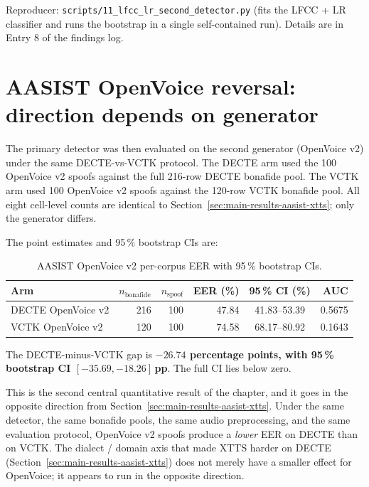 Reproducer: \texttt{scripts/11\_lfcc\_lr\_second\_detector.py} (fits the LFCC +
LR classifier and runs the bootstrap in a single self-contained
run). Details are in Entry 8 of the findings log.


\section{AASIST OpenVoice reversal: direction depends on generator}
\label{sec:main-results-aasist-openvoice}

The primary detector was then evaluated on the second generator
(OpenVoice v2) under the same DECTE-vs-VCTK protocol. The DECTE arm
used the 100 OpenVoice v2 spoofs against the full 216-row DECTE
bonafide pool. The VCTK arm used 100 OpenVoice v2 spoofs against
the 120-row VCTK bonafide pool. All eight cell-level counts are
identical to Section~\ref{sec:main-results-aasist-xtts}; only the generator differs.

The point estimates and 95\,\% bootstrap CIs are:

\begin{table}[t]
\centering
\caption{AASIST OpenVoice v2 per-corpus EER with 95\,\% bootstrap CIs.}
\label{tab:main-results-aasist-openvoice}
\begin{tabularx}{\linewidth}{X r r r c r}
\toprule
\textbf{Arm} & \textbf{$n_\text{bonafide}$} & \textbf{$n_\text{spoof}$} & \textbf{EER (\%)} & \textbf{95\,\% CI (\%)} & \textbf{AUC} \\
\midrule
DECTE OpenVoice v2 & 216 & 100 & 47.84 & 41.83--53.39 & 0.5675 \\
VCTK OpenVoice v2  & 120 & 100 & 74.58 & 68.17--80.92 & 0.1643 \\
\bottomrule
\end{tabularx}
\end{table}

The DECTE-minus-VCTK gap is \textbf{$-26.74$ percentage points,
with 95\,\% bootstrap CI $[-35.69, -18.26]$\,pp}. The full CI lies
below zero.

This is the second central quantitative result of the chapter, and
it goes in the opposite direction from Section~\ref{sec:main-results-aasist-xtts}.
Under the same detector, the same bonafide pools, the same audio
preprocessing, and the same evaluation protocol, OpenVoice v2
spoofs produce a \emph{lower} EER on DECTE than on VCTK. The
dialect / domain axis that made XTTS harder on DECTE
(Section~\ref{sec:main-results-aasist-xtts}) does not merely have a smaller effect for
OpenVoice; it appears to run in the opposite direction.

